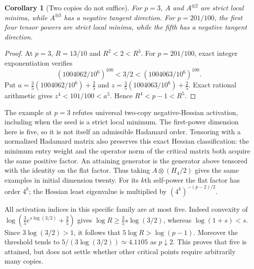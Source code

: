 \documentclass[11pt]{article}
\newtheorem{corollary}[theorem]{Corollary}
\begin{document}
\begin{corollary}[Two copies do not suffice]
For $p=3$, $A$ and $A^{\otimes2}$ are strict local minima, while
$A^{\otimes3}$ has a negative tangent direction. For $p=201/100$,
the first four tensor powers are strict local minima, while the fifth
has a negative tangent direction.
\end{corollary}
\begin{proof}
At $p=3$, $R=13/10$ and $R^2<2<R^3$.
For $p=201/100$, exact integer exponentiation verifies
\[
 (1004062/10^6)^{100}<3/2<(1004063/10^6)^{100}.
\]
Put $a=\frac35(1004062/10^6)+\frac25$ and
$z=\frac35(1004063/10^6)+\frac25$. Exact rational arithmetic gives
$z^4<101/100<a^5$. Hence $R^4<p-1<R^5$.
\end{proof}

The example at $p=3$ refutes universal two-copy negative-Hessian
activation, including when the seed is a strict local minimum.
The first-power dimension here is five, so it is not itself an
admissible Hadamard order. Tensoring with a normalized Hadamard matrix
also preserves this exact Hessian classification: the minimum entry
weight and the operator norm of the critical matrix both acquire
the same positive factor. An attaining generator is the generator
above tensored with the identity on the flat factor. Thus taking
$A\otimes(H_4/2)$ gives the same examples in initial dimension twenty.
For its $k$th self-power the flat factor has order $4^k$; the Hessian
least eigenvalue is multiplied by $(4^k)^{-(p-2)/2}$.

All activation indices in this specific family are at most five.
Indeed convexity of $\log(\frac35e^{s\log(3/2)}+\frac25)$ gives
$\log R\ge\frac35s\log(3/2)$, whereas $\log(1+s)<s$.
Since $3\log(3/2)>1$, it follows that $5\log R>\log(p-1)$.
Moreover the threshold tends to $5/(3\log(3/2))\simeq4.1105$ as
$p\downarrow2$. This proves that five is attained, but does not
settle whether other critical points require arbitrarily many copies.
\end{document}
